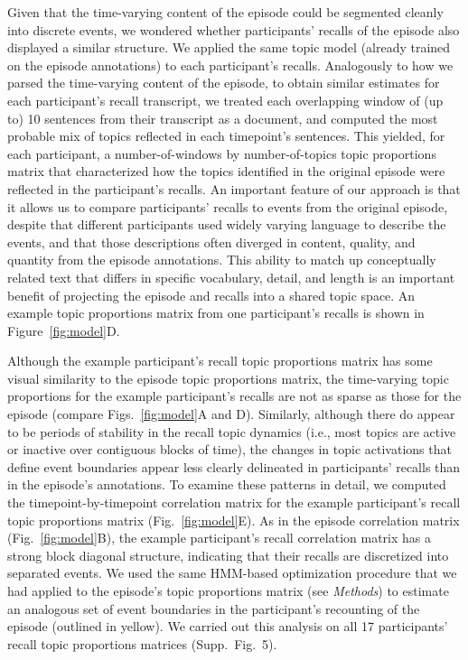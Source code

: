 \documentclass[10pt]{article}
\newcommand{\corrmats}{5}
\begin{document}
Given that the time-varying content of the episode could be segmented cleanly into discrete events, we wondered whether participants' recalls of the episode also displayed a similar structure.  We applied the same topic model (already trained on the episode annotations) to each participant's recalls.  Analogously to how we parsed the time-varying content of the episode, to obtain similar estimates for each participant's recall transcript, we treated each overlapping  window of (up to) 10 sentences from their transcript as a document, and computed the most probable mix of topics reflected in each timepoint's sentences.  This yielded, for each participant, a number-of-windows by number-of-topics topic proportions matrix that characterized how the topics identified in the original episode were reflected in the participant's recalls.  An important feature of our approach is that it allows us to compare participants' recalls to events from the original episode, despite that different participants used widely varying language to describe the events, and that those descriptions often diverged in content, quality, and quantity from the episode annotations.  This ability to match up conceptually related text that differs in specific vocabulary, detail, and length is an important benefit of projecting the episode and recalls into a shared topic space.  An example topic proportions matrix from one participant's recalls is shown in Figure~\ref{fig:model}D.

Although the example participant's recall topic proportions matrix has some visual similarity to the episode topic proportions matrix, the time-varying topic proportions for the example participant's recalls are not as sparse as those for the episode (compare Figs.~\ref{fig:model}A and D).  Similarly, although there do appear to be periods of stability in the recall topic dynamics (i.e., most topics are active or inactive over contiguous blocks of time), the changes in topic activations that define event boundaries appear less clearly delineated in participants' recalls than in the episode's annotations.  To examine these patterns in detail, we computed the timepoint-by-timepoint correlation matrix for the example participant's recall topic proportions matrix (Fig.~\ref{fig:model}E).  As in the episode correlation matrix (Fig.~\ref{fig:model}B), the example participant's recall correlation matrix has a strong block diagonal structure, indicating that their recalls are discretized into separated events.  We used the same HMM-based optimization procedure that we had applied to the episode's topic proportions matrix (see \textit{Methods}) to estimate an analogous set of event boundaries in the participant's recounting of the episode (outlined in yellow).  We carried out this analysis on all 17 participants' recall topic proportions matrices (Supp.\ Fig.~\corrmats).
\end{document}
